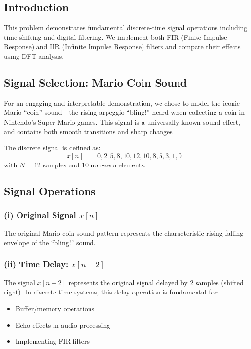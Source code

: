 \documentclass[12pt,a4paper]{article}
\begin{document}
\subsection{Introduction}

This problem demonstrates fundamental discrete-time signal operations including time shifting and digital filtering. We implement both FIR (Finite Impulse Response) and IIR (Infinite Impulse Response) filters and compare their effects using DFT analysis.

\subsection{Signal Selection: Mario Coin Sound}

For an engaging and interpretable demonstration, we chose to model the iconic Mario ``coin'' sound - the rising arpeggio ``bling!'' heard when collecting a coin in Nintendo's Super Mario games. This signal is a universally known sound effect, and contains both smooth transitions and sharp changes

The discrete signal is defined as:
\begin{equation}
    x[n] = [0, 2, 5, 8, 10, 12, 10, 8, 5, 3, 1, 0]
\end{equation}
with $N = 12$ samples and 10 non-zero elements.

\subsection{Signal Operations}

\subsubsection{(i) Original Signal $x[n]$}

The original Mario coin sound pattern represents the characteristic rising-falling envelope of the ``bling!'' sound.

\subsubsection{(ii) Time Delay: $x[n-2]$}

The signal $x[n-2]$ represents the original signal delayed by 2 samples (shifted right). In discrete-time systems, this delay operation is fundamental for:
\begin{itemize}
    \item Buffer/memory operations
    \item Echo effects in audio processing
    \item Implementing FIR filters
\end{itemize}
\end{document}
